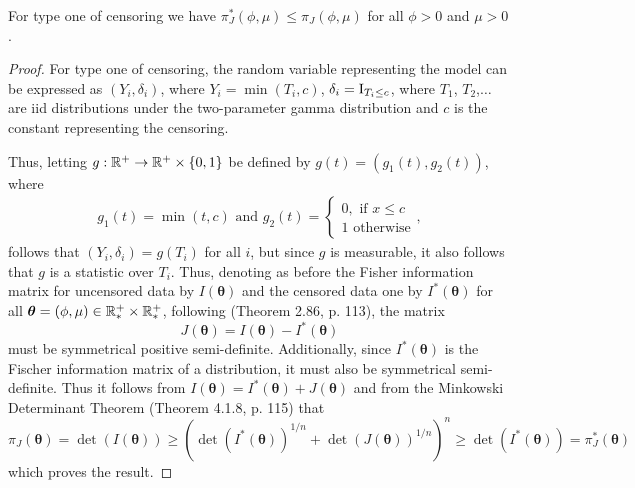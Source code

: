 \begin{proposition}\label{jeffreycens} For type one of censoring we have $\pi_{J}^*(\phi,\mu)\leq \pi_J(\phi,\mu)$ for all $\phi>0$ and $\mu>0$.
\end{proposition}
\begin{proof} For type one of censoring, the random variable representing the model can be expressed as $(Y_i,\delta_i)$, where $Y_i=\min(T_i,c)$, $\delta_i=\operatorname{I}_{T_i\leq c}$, where $T_1$, $T_2$,$\ldots$ are iid distributions under the two-parameter gamma distribution and $c$ is the constant representing the censoring.

Thus, letting $g:\mathbb{R}^+\to \mathbb{R}^+\times \{0,1\}$ be defined by $g(t)=(g_1(t),g_2(t))$, where
\begin{equation*}
\begin{aligned}
g_1(t) = \min(t,c)\mbox{ and }
g_2(t) = \begin{cases}0,\mbox{ if }x\leq c\\
1\mbox{ otherwise}
\end{cases},
\end{aligned}
\end{equation*}
follows that $(Y_i,\delta_i) = g(T_i)$ for all $i$, but since $g$ is measurable, it also follows that $g$ is a statistic over $T_i$. Thus, denoting as before the Fisher information matrix for uncensored data by $I(\boldsymbol{\theta})$ and the censored data one by $I^*(\boldsymbol{\theta})$ for all $\boldsymbol{\theta}=(\phi,\mu)\in \mathbb{R}^+_*\times \mathbb{R}^+_*$, following \cite{2013-Schervish} (Theorem 2.86, p. 113), the matrix
\begin{equation*} J(\boldsymbol{\theta})=I(\boldsymbol{\theta})-I^*(\boldsymbol{\theta})
\end{equation*}
must be symmetrical positive semi-definite. Additionally, since $I^*(\boldsymbol{\theta})$ is the Fischer information matrix of a distribution, it must also be symmetrical semi-definite. Thus it follows from $I(\boldsymbol{\theta})=I^*(\boldsymbol{\theta})+J(\boldsymbol{\theta})$ and from the Minkowski Determinant Theorem \cite{2010-Marcus} (Theorem 4.1.8, p. 115) that
\begin{equation*} \pi_{J}(\boldsymbol{\theta})=\det(I(\boldsymbol{\theta})) \geq \left(\det\left(I^*(\boldsymbol{\theta})\right)^{1/n} + \det\left(J(\boldsymbol{\theta})\right)^{1/n}\right)^n\geq \det(I^*(\boldsymbol{\theta}))=\pi_{J}^*(\boldsymbol{\theta}) 
\end{equation*}
which proves the result.
\end{proof}

